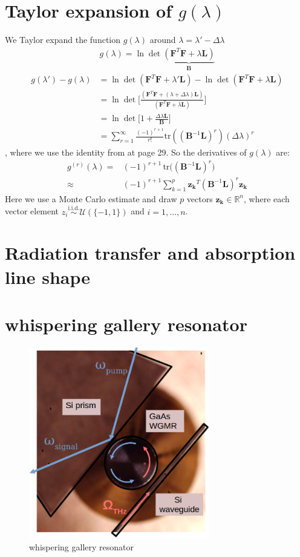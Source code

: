 \chapter{Taylor expansion of  $g(\lambda)$}
\label{ap:taylor}
We Taylor expand the function $g(\lambda)$ around $\lambda = \lambda'  - \Delta \lambda$
\begin{align}
    g(\lambda) = \ln \det \underbrace{(\bm{F}^T  \bm{F} + \lambda \bm{L})}_{\bm{B}}
\end{align}
\begin{align}
       g(\lambda') -    g(\lambda) &=  \ln \det ( \bm{F}^T  \bm{F} + \lambda' \bm{L}) -  \ln \det (\bm{F}^T  \bm{F} + \lambda \bm{L}) \\
    &=  \ln \det \Bigg[ \frac{(\bm{F}^T  \bm{F} + (\lambda + \Delta \lambda) \bm{L}) }{ ( \bm{F}^T  \bm{F} + \lambda \bm{L}) } \Bigg]  \\
       &=  \ln \det \Bigg[ 1 + \frac{ \Delta \lambda \bm{L} }{ \bm{B} } \Bigg]\\
       & = \sum_{r = 1}^{\infty} \frac{(-1)^{r+1}}{r !}\text{tr} (   (\bm{B}^{-1}  \bm{L} )^r  )  (\Delta \lambda)^r
\end{align}, where we use the identity from \cite{gohberg2012traces} at page 29.
So the derivatives of $g(\lambda)$ are:
\begin{align}
    g^{(r)} ( \lambda) =&  (-1)^{r+1} \, \text{tr} \big( (\bm{B}^{-1}\bm{ L })^r \big)\\
\approx& (-1)^{r+1} \sum^p_{k=1} \bm{z_k}^T (\bm{B}^{-1} \bm{L} )^r \bm{z_k}  
\end{align} 
Here we use a Monte Carlo estimate and draw $p$ vectors $\bm{z_k} \in \mathbb{R}^n $, where each vector element $z_i \overset{\text{i.i.d.}}{\sim} \mathcal{U} ( \{ -1, 1 \} )$ and $i = 1 , \dots, n$.

\chapter{Radiation transfer and absorption line shape}
\label{ap:RTE}


\chapter{whispering gallery resonator}
\label{ap:resonator}


\begin{figure}
\centering\includegraphics[width=0.7\textwidth]{GaAs_setup4.png} 
\caption[whispering gallery resonator]{whispering gallery resonator}
\label{fig:GaAsRes}
\end{figure}
